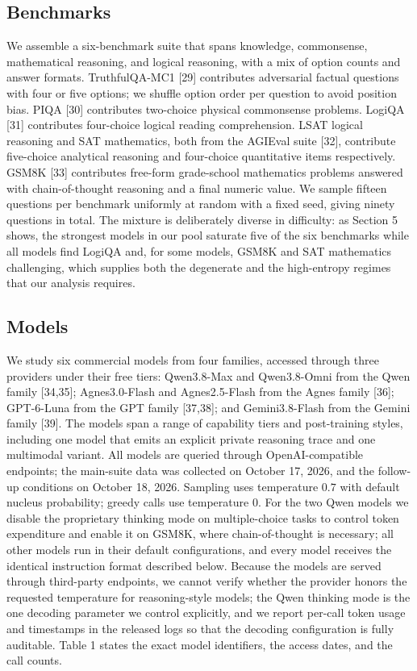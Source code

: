 \documentclass[preprint,12pt]{elsarticle}
\begin{document}
\subsection{Benchmarks}

We assemble a six-benchmark suite that spans knowledge, commonsense, mathematical reasoning, and logical reasoning, with a mix of option counts and answer formats. TruthfulQA-MC1 [29] contributes adversarial factual questions with four or five options; we shuffle option order per question to avoid position bias. PIQA [30] contributes two-choice physical commonsense problems. LogiQA [31] contributes four-choice logical reading comprehension. LSAT logical reasoning and SAT mathematics, both from the AGIEval suite [32], contribute five-choice analytical reasoning and four-choice quantitative items respectively. GSM8K [33] contributes free-form grade-school mathematics problems answered with chain-of-thought reasoning and a final numeric value. We sample fifteen questions per benchmark uniformly at random with a fixed seed, giving ninety questions in total. The mixture is deliberately diverse in difficulty: as Section 5 shows, the strongest models in our pool saturate five of the six benchmarks while all models find LogiQA and, for some models, GSM8K and SAT mathematics challenging, which supplies both the degenerate and the high-entropy regimes that our analysis requires.

\subsection{Models}

We study six commercial models from four families, accessed through three providers under their free tiers: Qwen3.8-Max and Qwen3.8-Omni from the Qwen family [34,35]; Agnes3.0-Flash and Agnes2.5-Flash from the Agnes family [36]; GPT-6-Luna from the GPT family [37,38]; and Gemini3.8-Flash from the Gemini family [39]. The models span a range of capability tiers and post-training styles, including one model that emits an explicit private reasoning trace and one multimodal variant. All models are queried through OpenAI-compatible endpoints; the main-suite data was collected on October 17, 2026, and the follow-up conditions on October 18, 2026. Sampling uses temperature $0.7$ with default nucleus probability; greedy calls use temperature $0$. For the two Qwen models we disable the proprietary thinking mode on multiple-choice tasks to control token expenditure and enable it on GSM8K, where chain-of-thought is necessary; all other models run in their default configurations, and every model receives the identical instruction format described below. Because the models are served through third-party endpoints, we cannot verify whether the provider honors the requested temperature for reasoning-style models; the Qwen thinking mode is the one decoding parameter we control explicitly, and we report per-call token usage and timestamps in the released logs so that the decoding configuration is fully auditable. Table 1 states the exact model identifiers, the access dates, and the call counts.
\end{document}
